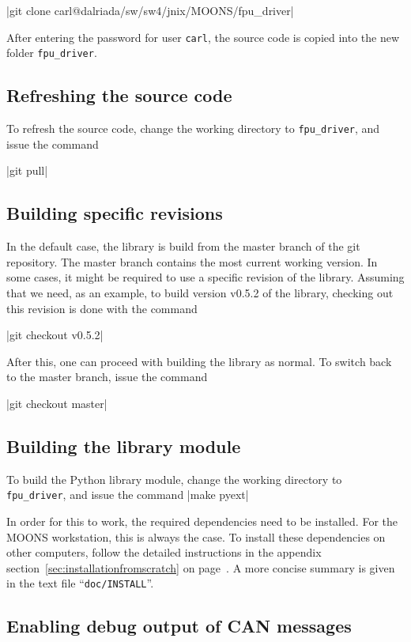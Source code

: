 \documentclass[11pt,a4paper]{scrartcl}
\begin{document}
|git clone carl@dalriada/sw/sw4/jnix/MOONS/fpu_driver|

After entering the password for user \texttt{carl}, the
source code is copied into the new folder \texttt{fpu\_driver}.

\subsection{Refreshing the source code}
To refresh the source code, change the
working directory to \texttt{fpu\_driver},
and issue the command

|git pull|


\subsection{Building specific revisions}
In the default case, the library is build from
the master branch of the git repository.
The master branch contains the most current
working version.
In some cases, it might be required to
use a specific revision of the library.
Assuming that we need, as an example,
to build version v0.5.2 of the library,
checking out this revision is done with the
command

|git checkout v0.5.2|

After this, one can proceed with building the library as normal. To
switch back to the master branch, issue the command

|git checkout master|


\subsection{Building the library module}
To build the Python library module,
change the working directory to \texttt{fpu\_driver},
and issue the command |make pyext|

In order for this to work, the required dependencies need to be
installed. For the MOONS workstation, this is always the case. To
install these dependencies on other computers, follow the detailed
instructions in the appendix section~\ref{sec:installationfromscratch}
on page~\pageref{sec:installationfromscratch}.  A more concise summary
is given in the text file ``\texttt{doc/INSTALL}''.

\subsection{Enabling debug output of CAN messages}
\end{document}
